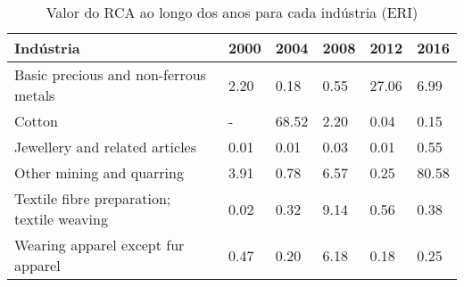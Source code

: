 \begin{table}
\centering
\caption{Valor do RCA ao longo dos anos para cada indústria (ERI)}
\label{tab:ex3-tempo-ERI}
\begin{tabular}{p{6cm}p{1.5cm}p{1.5cm}p{1.5cm}p{1.5cm}p{1.5cm}}
\toprule
                                 Indústria & 2000 &  2004 & 2008 &  2012 &  2016 \\
\midrule
     Basic precious and non-ferrous metals & 2.20 &  0.18 & 0.55 & 27.06 &  6.99 \\
                                    Cotton &    - & 68.52 & 2.20 &  0.04 &  0.15 \\
            Jewellery and related articles & 0.01 &  0.01 & 0.03 &  0.01 &  0.55 \\
                 Other mining and quarring & 3.91 &  0.78 & 6.57 &  0.25 & 80.58 \\
Textile fibre preparation; textile weaving & 0.02 &  0.32 & 9.14 &  0.56 &  0.38 \\
        Wearing apparel except fur apparel & 0.47 &  0.20 & 6.18 &  0.18 &  0.25 \\
\bottomrule
\end{tabular}
\end{table}
